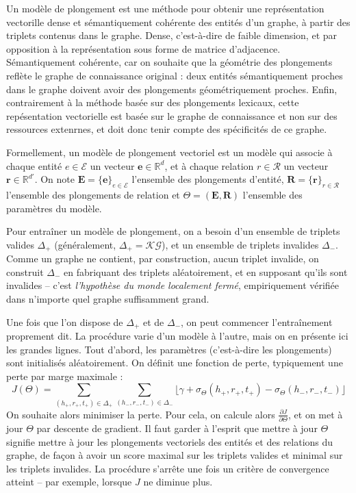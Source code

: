 Un modèle de plongement est une méthode pour obtenir une représentation vectorille dense et sémantiquement cohérente des entités d'un graphe, à partir des triplets contenus dans le graphe. Dense, c'est-à-dire de faible dimension, et par opposition à la représentation sous forme de matrice d'adjacence. Sémantiquement cohérente, car on souhaite que la géométrie des plongements reflète le graphe de connaissance original : deux entités sémantiquement proches dans le graphe doivent avoir des plongements géométriquement proches. Enfin, contrairement à la méthode basée sur des plongements lexicaux, cette repésentation vectorielle est basée sur le graphe de connaissance et non sur des ressources extenrnes, et doit donc tenir compte des spécificités de ce graphe.

Formellement, un modèle de plongement vectoriel est un modèle qui associe à chaque entité $e \in \mathcal{E}$ un vecteur $\mathbf{e} \in \mathbb{R}^d$, et à chaque relation $r \in \mathcal{R}$ un vecteur $\mathbf{r} \in \mathbb{R}^{d'}$. On note $\mathbf{E} = \{\mathbf{e}\}_{e \in \mathcal{E}} $ l'ensemble des plongements d'entité, $\mathbf{R} = \{\mathbf{r}\}_{r \in \mathcal{R}} $ l'ensemble des plongements de relation et $\Theta = (\mathbf{E}, \mathbf{R})$ l'ensemble des paramètres du modèle. 


Pour entraîner un modèle de plongement, on a besoin d'un ensemble de triplets valides $\Delta_+$ (généralement, $\Delta_+ = \mathcal{KG}$), et un ensemble de triplets invalides $\Delta_-$. Comme un graphe ne contient, par construction, aucun triplet invalide, on construit $\Delta_-$ en fabriquant des triplets aléatoirement, et en supposant qu'ils sont invalides – c'est \textit{l'hypothèse du monde localement fermé}, empiriquement vérifiée dans n'importe quel graphe suffisamment grand.

Une fois que l'on dispose de $\Delta_+$ et de $\Delta_-$, on peut commencer l'entraînement proprement dit. La procédure varie d'un modèle à l'autre, mais on en présente ici les grandes lignes. Tout d'abord, les paramètres (c'est-à-dire les plongements) sont initialisés aléatoirement. On définit une fonction de perte, typiquement une perte par marge maximale :
$$
J(\Theta) = \sum_{(h_+, r_+, t_+) \in \Delta_+} \sum_{(h_-, r_-, t_-) \in \Delta_-} \lfloor \gamma + \sigma_\Theta(h_+, r_+, t_+) - \sigma_\Theta(h_-, r_-, t_-) \rfloor
$$
On souhaite alors minimiser la perte. Pour cela, on calcule alors $\displaystyle \frac{\partial J}{\partial \Theta}$, et on met à jour $\Theta$ par descente de gradient. Il faut garder à l'esprit que mettre à jour $\Theta$ signifie mettre à jour les plongements vectoriels des entités et des relations du graphe, de façon à avoir un score maximal sur les triplets valides et minimal sur les triplets invalides. La procédure s'arrête une fois un critère de convergence atteint – par exemple, lorsque $J$ ne diminue plus.

